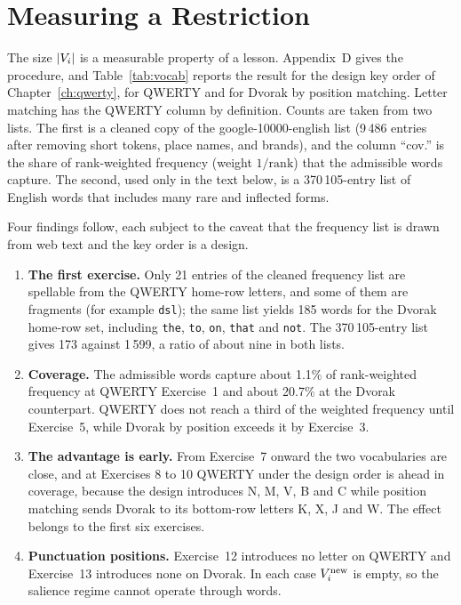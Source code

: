 \section{Measuring a Restriction}

The size $|V_i|$ is a measurable property of a lesson. Appendix~D gives the procedure, and Table~\ref{tab:vocab} reports the result for the design key order of Chapter~\ref{ch:qwerty}, for QWERTY and for Dvorak by position matching. Letter matching has the QWERTY column by definition. Counts are taken from two lists. The first is a cleaned copy of the google-10000-english list (9\,486 entries after removing short tokens, place names, and brands), and the column ``cov.'' is the share of rank-weighted frequency (weight $1/\mathrm{rank}$) that the admissible words capture. The second, used only in the text below, is a 370\,105-entry list of English words that includes many rare and inflected forms.

\begin{table}[ht]
\centering
\caption{Admissible vocabulary by exercise under the design key order. Letters only; punctuation keys are omitted from the ``new'' columns because they form no words.}
\label{tab:vocab}

\end{table}

Four findings follow, each subject to the caveat that the frequency list is drawn from web text and the key order is a design.

\begin{enumerate}
\item \textbf{The first exercise.} Only 21 entries of the cleaned frequency list are spellable from the QWERTY home-row letters, and some of them are fragments (for example \texttt{dsl}); the same list yields 185 words for the Dvorak home-row set, including \texttt{the}, \texttt{to}, \texttt{on}, \texttt{that} and \texttt{not}. The 370\,105-entry list gives 173 against 1\,599, a ratio of about nine in both lists.
\item \textbf{Coverage.} The admissible words capture about 1.1\% of rank-weighted frequency at QWERTY Exercise~1 and about 20.7\% at the Dvorak counterpart. QWERTY does not reach a third of the weighted frequency until Exercise~5, while Dvorak by position exceeds it by Exercise~3.
\item \textbf{The advantage is early.} From Exercise~7 onward the two vocabularies are close, and at Exercises 8 to 10 QWERTY under the design order is ahead in coverage, because the design introduces N, M, V, B and C while position matching sends Dvorak to its bottom-row letters K, X, J and W. The effect belongs to the first six exercises.
\item \textbf{Punctuation positions.} Exercise~12 introduces no letter on QWERTY and Exercise~13 introduces none on Dvorak. In each case $V_i^{\mathrm{new}}$ is empty, so the salience regime cannot operate through words.
\end{enumerate}

